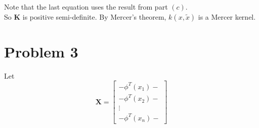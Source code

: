 \documentclass[12pt]{article}
\begin{document}
Note that the last equation uses the result from part $(c)$. \\

So \textbf{K} is positive semi-definite. By Mercer's theorem, $k(x, \tilde{x})$ is a Mercer kernel.

\section*{Problem 3}

Let
\begin{equation*}
  \textbf{X} =
  \begin{bmatrix}
    - \phi^T(x_1)- \\
    - \phi^T(x_2)- \\
    \vdots \\
    -\phi^T(x_n)- 
  \end{bmatrix}
\end{equation*}
\end{document}
